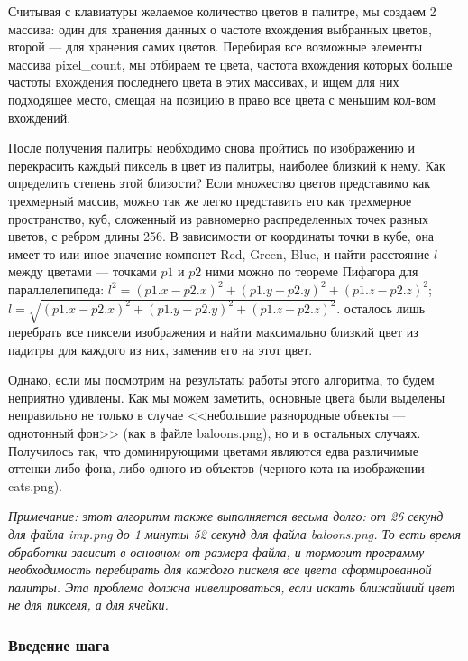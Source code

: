 \documentclass[12pt]{article}
\begin{document}
{	Считывая с клавиатуры желаемое количество цветов в палитре, мы создаем 2 массива: один для хранения данных о частоте вхождения выбранных цветов, второй --- для хранения самих цветов. Перебирая все возможные элементы массива pixel\_count, мы отбираем те цвета, частота вхождения которых больше частоты вхождения последнего цвета в этих массивах, и ищем для них подходящее место, смещая на позицию в право все цвета с меньшим кол-вом вхождений.
	
	После получения палитры необходимо снова пройтись по изображению и перекрасить каждый пиксель в цвет из палитры, наиболее близкий к нему. Как определить степень этой близости? Если множество цветов представимо как трехмерный массив, можно так же легко представить его как трехмерное пространство, куб, сложенный из равномерно распределенных точек разных цветов, с ребром длины 256. В зависимости от координаты точки в кубе, она имеет то или иное значение компонет Red, Green, Blue, и найти расстояние $l$ между цветами --- точками $p1$ и $p2$ ними можно по теореме Пифагора для параллелепипеда: $l^2 = (p1.x-p2.x)^2 + (p1.y-p2.y)^2 +(p1.z-p2.z)^2$; $l = \sqrt{(p1.x-p2.x)^2 + (p1.y-p2.y)^2 +(p1.z-p2.z)^2}$. осталось лишь перебрать все пиксели изображения и найти максимально близкий цвет из падитры для каждого из них, заменив его на этот цвет.
	
	Однако, если мы посмотрим на \hyperref[reduced_cats]{результаты работы} этого алгоритма, то будем неприятно удивлены. Как мы можем заметить, основные цвета были выделены неправильно не только в случае <<небольшие разнородные объекты --- однотонный фон>> (как в файле baloons.png), но и в остальных случаях. Получилось так, что доминирующими цветами являются едва различимые оттенки либо фона, либо одного из объектов (черного кота на изображении cats.png).
	
	{\it Примечание: этот алгоритм также выполняется весьма долго: от 26 секунд для файла imp.png до 1 минуты 52 секунд для файла baloons.png. То есть время обработки зависит в основном от размера файла, и тормозит программу необходимость перебирать для каждого пискеля все цвета сформированной палитры. Эта проблема должна нивелироваться, если искать ближайший цвет не для пикселя, а для ячейки.}
	
	\subsubsection{Введение шага}
	
}
\end{document}
